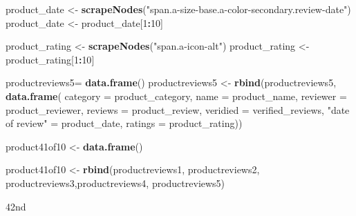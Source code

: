 \documentclass[
]{article}
\newenvironment{Shaded}{\begin{snugshade}}{\end{snugshade}}
\newcommand{\AttributeTok}[1]{\textcolor[rgb]{0.13,0.29,0.53}{#1}}
\newcommand{\DecValTok}[1]{\textcolor[rgb]{0.00,0.00,0.81}{#1}}
\newcommand{\FunctionTok}[1]{\textcolor[rgb]{0.13,0.29,0.53}{\textbf{#1}}}
\newcommand{\NormalTok}[1]{#1}
\newcommand{\OtherTok}[1]{\textcolor[rgb]{0.56,0.35,0.01}{#1}}
\newcommand{\SpecialCharTok}[1]{\textcolor[rgb]{0.81,0.36,0.00}{\textbf{#1}}}
\newcommand{\StringTok}[1]{\textcolor[rgb]{0.31,0.60,0.02}{#1}}
\begin{document}
\begin{Shaded}
\begin{Highlighting}[]
\NormalTok{  product\_date }\OtherTok{\textless{}{-}} \FunctionTok{scrapeNodes}\NormalTok{(}\StringTok{"span.a{-}size{-}base.a{-}color{-}secondary.review{-}date"}\NormalTok{)}
\NormalTok{  product\_date }\OtherTok{\textless{}{-}}\NormalTok{ product\_date[}\DecValTok{1}\SpecialCharTok{:}\DecValTok{10}\NormalTok{]}
  
\NormalTok{  product\_rating }\OtherTok{\textless{}{-}} \FunctionTok{scrapeNodes}\NormalTok{(}\StringTok{"span.a{-}icon{-}alt"}\NormalTok{)}
\NormalTok{  product\_rating }\OtherTok{\textless{}{-}}\NormalTok{ product\_rating[}\DecValTok{1}\SpecialCharTok{:}\DecValTok{10}\NormalTok{]}
  
\NormalTok{  productreviews5}\OtherTok{=} \FunctionTok{data.frame}\NormalTok{()}
\NormalTok{  productreviews5 }\OtherTok{\textless{}{-}} \FunctionTok{rbind}\NormalTok{(productreviews5, }\FunctionTok{data.frame}\NormalTok{(}
                      \AttributeTok{category =}\NormalTok{ product\_category,}
                      \AttributeTok{name =}\NormalTok{ product\_name,}
                      \AttributeTok{reviewer =}\NormalTok{ product\_reviewer,}
                      \AttributeTok{reviews =}\NormalTok{ product\_review,}
                      \AttributeTok{veridied =}\NormalTok{ verified\_reviews,}
                      \StringTok{"date of review"} \OtherTok{=}\NormalTok{ product\_date,}
                      \AttributeTok{ratings =}\NormalTok{ product\_rating))}
  
\NormalTok{  product41of10 }\OtherTok{\textless{}{-}} \FunctionTok{data.frame}\NormalTok{()}
  
\NormalTok{  product41of10 }\OtherTok{\textless{}{-}} \FunctionTok{rbind}\NormalTok{(productreviews1, productreviews2, productreviews3,productreviews4, productreviews5)}
\end{Highlighting}
\end{Shaded}

42nd
\end{document}
